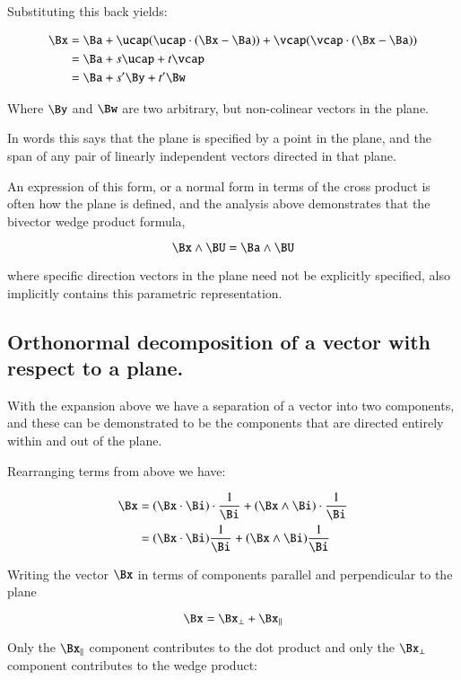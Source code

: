 \documentclass{article}
\begin{document}
Substituting this back yields:

\begin{align*}
\Bx 
&= \Ba + \ucap (\ucap \cdot (\Bx - \Ba)) + \vcap (\vcap \cdot (\Bx - \Ba)) \\
&= \Ba + s \ucap + t \vcap \\
&= \Ba + s' \By + t' \Bw \\
\end{align*}

Where $\By$ and $\Bw$ are two arbitrary, but non-colinear vectors 
in the plane.

In words this says that the plane is specified by a point in the plane,
and the span of any pair of linearly independent vectors directed in that plane.

An expression of this form, or a normal form in terms of the cross product
is often how the plane is defined, and the analysis above demonstrates
that the bivector wedge product formula,

\[
\Bx \wedge \BU = \Ba \wedge \BU
\]

where specific direction vectors in the plane need not be explicitly specified,
also implicitly contains this parametric representation.

\subsection{ Orthonormal decomposition of a vector with respect to a plane. }

With the expansion above we have a separation of a vector into two
components, and these can be demonstrated to be the components that are
directed entirely within and out of the plane.

Rearranging terms from above we have:

\begin{align*}
\Bx 
&= 
(\Bx \cdot \Bi) \cdot \frac{1}{\Bi} + (\Bx \wedge \Bi) \cdot \frac{1}{\Bi} \\
&= 
(\Bx \cdot \Bi) \frac{1}{\Bi} + (\Bx \wedge \Bi) \frac{1}{\Bi} \\
\end{align*}

Writing the vector $\Bx$ in terms of components parallel and perpendicular
to the plane

\[
\Bx = \Bx_{\perp} + \Bx_{\parallel}
\]

Only the $\Bx_{\parallel}$ component contributes to the dot product
and only the $\Bx_{\perp}$ component contributes to the wedge product:
\end{document}
